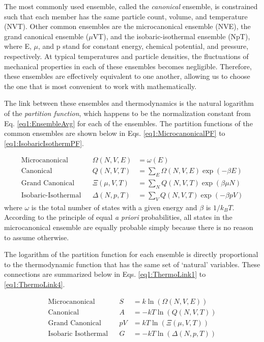 The most commonly used ensemble, called the \emph{canonical} ensemble, is
constrained such that each member has the same particle count, volume, and
temperature (NVT). Other common ensembles are the microcanonical ensemble (NVE),
the grand canonical ensemble ($\mu$VT), and the isobaric-isothermal ensemble
(NpT), where E, $\mu$, and p stand for constant energy, chemical potential, and
pressure, respectively. At typical temperatures and particle densities, the
fluctuations of mechanical properties in each of these ensembles becomes
negligible. Therefore, these ensembles are effectively equivalent to one
another, allowing us to choose the one that is most convenient to work with
mathematically.

The link between these ensembles and thermodynamics is the natural logarithm of
the \emph{partition function}, which happens to be the normalization constant
from Eq. \ref{eq1:EnsembleAvg} for each of the ensembles. The partition
functions of the common ensembles are shown below in Eqs.
\ref{eq1:MicrocanonicalPF} to \ref{eq1:IsobaricIsothermPF}.

\begin{align}
   \text{Microcanonical} && \Omega(N, V, E) & = \omega(E) 
      \label{eq1:MicrocanonicalPF} \\
   \text{Canonical} && Q(N, V, T) & = \sum_E \Omega(N, V, E) 
               \exp(-\beta E) 
               \label{eq1:CanonicalPF} \\
   \text{Grand Canonical} && \Xi(\mu, V, T) & = \sum _ N 
               Q(N, V, T) \exp(\beta \mu N) 
               \label{eq1:GrandCanonicalPF} \\
   \text{Isobaric-Isothermal} && \Delta(N, p, T) & = \sum _ V
               Q(N, V, T) \exp(-\beta p V)
               \label{eq1:IsobaricIsothermPF}
\end{align}
where $\omega$ is the total number of states with a given energy and $\beta$ is
$1 / k_BT$. According to the principle of equal \emph{a priori} probabilities,
all states in the microcanonical ensemble are equally probable simply because
there is no reason to assume otherwise.

The logarithm of the partition function for each ensemble is directly
proportional to the thermodynamic function that has the same set of `natural'
variables. These connections are summarized below in Eqs. \ref{eq1:ThermoLink1}
to \ref{eq1:ThermoLink4}. \cite{McQuarrie_Book_StatMech_1973}

\begin{align}
   \text{Microcanonical} && S & = k \ln \left ( \Omega (N, V, E) \right ) 
      \label{eq1:ThermoLink1} \\
   \text{Canonical} && A & = -kT \ln \left ( Q (N, V, T) \right ) 
      \label{eq1:ThermoLink2} \\
   \text{Grand Canonical} && p V & = kT \ln \left ( \Xi (\mu, V, T) \right ) 
      \label{eq1:ThermoLink3} \\
   \text{Isobaric Isothermal} && G & = - kT \ln \left ( \Delta (N, p, T) \right )
      \label{eq1:ThermoLink4}
\end{align}

